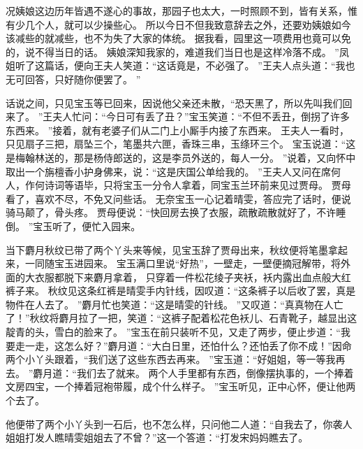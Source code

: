 况姨娘这边历年皆遇不遂心的事故，那园子也太大，一时照顾不到，皆有关系，惟有少几个人，就可以少操些心。
所以今日不但我致意辞去之外，还要劝姨娘如今该减些的就减些，也不为失了大家的体统。
据我看，园里这一项费用也竟可以免的，说不得当日的话。
姨娘深知我家的，难道我们当日也是这样冷落不成。
”凤姐听了这篇话，便向王夫人笑道：“这话竟是，不必强了。
”王夫人点头道：“我也无可回答，只好随你便罢了。
”\par
话说之间，只见宝玉等已回来，因说他父亲还未散，“恐天黑了，所以先叫我们回来了。
”王夫人忙问：“今日可有丢了丑？”宝玉笑道：“不但不丢丑，倒拐了许多东西来。
”接着，就有老婆子们从二门上小厮手内接了东西来。
王夫人一看时，只见扇子三把，扇坠三个，笔墨共六匣，香珠三串，玉绦环三个。
宝玉说道：“这是梅翰林送的，那是杨侍郎送的，这是李员外送的，每人一分。
”说着，又向怀中取出一个旃檀香小护身佛来，说：“这是庆国公单给我的。
”王夫人又问在席何人，作何诗词等语毕，只将宝玉一分令人拿着，同宝玉兰环前来见过贾母。
贾母看了，喜欢不尽，不免又问些话。
无奈宝玉一心记着晴雯，答应完了话时，便说骑马颠了，骨头疼。
贾母便说：“快回房去换了衣服，疏散疏散就好了，不许睡倒。
”宝玉听了，便忙入园来。
\par
当下麝月秋纹已带了两个丫头来等候，见宝玉辞了贾母出来，秋纹便将笔墨拿起来，一同随宝玉进园来。
宝玉满口里说“好热”，一壁走，一壁便摘冠解带，将外面的大衣服都脱下来麝月拿着，
只穿着一件松花绫子夹袄，袄内露出血点般大红裤子来。
秋纹见这条红裤是晴雯手内针线，因叹道：“这条裤子以后收了罢，真是物件在人去了。
”麝月忙也笑道：“这是晴雯的针线。
”又叹道：“真真物在人亡了！”秋纹将麝月拉了一把，笑道：“这裤子配着松花色袄儿、石青靴子，越显出这靛青的头，雪白的脸来了。
”宝玉在前只装听不见，又走了两步，便止步道：“我要走一走，这怎么好？”麝月道：“大白日里，还怕什么？还怕丢了你不成！”因命两个小丫头跟着，“我们送了这些东西去再来。
”宝玉道：“好姐姐，等一等我再去。
”麝月道：“我们去了就来。
两个人手里都有东西，倒像摆执事的，一个捧着文房四宝，一个捧着冠袍带履，成个什么样子。
”宝玉听见，正中心怀，便让他两个去了。
\par
他便带了两个小丫头到一石后，也不怎么样，只问他二人道：“自我去了，你袭人姐姐打发人瞧晴雯姐姐去了不曾？”这一个答道：“打发宋妈妈瞧去了。
